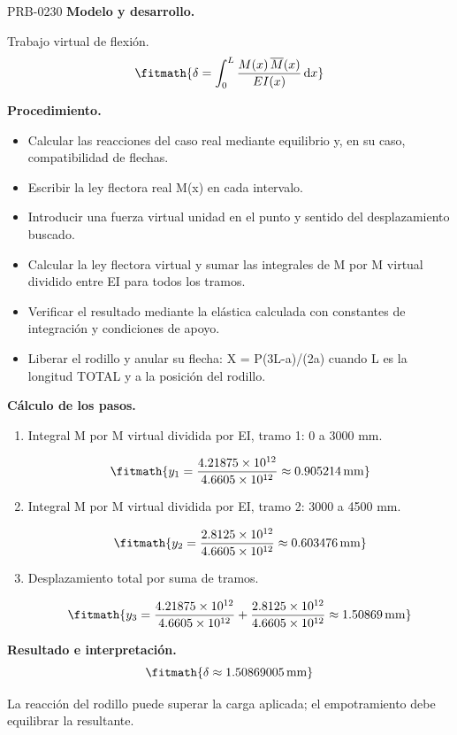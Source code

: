 \begin{studiumworked}{PRB-0230}
\textbf{Modelo y desarrollo.}

Trabajo virtual de flexión.\[\fitmath{\delta = \int_{0}^{L}\frac{M(x)\,\overline{M}(x)}{E I(x)}\,\mathrm{d}x}\]

\textbf{Procedimiento.}\begin{itemize}\item Calcular las reacciones del caso real mediante equilibrio y, en su caso, compatibilidad de flechas.
\item Escribir la ley flectora real M(x) en cada intervalo.
\item Introducir una fuerza virtual unidad en el punto y sentido del desplazamiento buscado.
\item Calcular la ley flectora virtual y sumar las integrales de M por M virtual dividido entre EI para todos los tramos.
\item Verificar el resultado mediante la elástica calculada con constantes de integración y condiciones de apoyo.
\item Liberar el rodillo y anular su flecha: X = P(3L-a)/(2a) cuando L es la longitud TOTAL y a la posición del rodillo.\end{itemize}

\textbf{Cálculo de los pasos.}

\begin{enumerate}

\item Integral M por M virtual dividida por EI, tramo 1: 0 a 3000 mm.

\[\fitmath{y_{1}=\frac{4.21875\times10^{12}}{4.6605\times10^{12}}\approx 0.905214\,\mathrm{mm}}\]

\item Integral M por M virtual dividida por EI, tramo 2: 3000 a 4500 mm.

\[\fitmath{y_{2}=\frac{2.8125\times10^{12}}{4.6605\times10^{12}}\approx 0.603476\,\mathrm{mm}}\]

\item Desplazamiento total por suma de tramos.

\[\fitmath{y_{3}=\frac{4.21875\times10^{12}}{4.6605\times10^{12}}+\frac{2.8125\times10^{12}}{4.6605\times10^{12}}\approx 1.50869\,\mathrm{mm}}\]

\end{enumerate}

\textbf{Resultado e interpretación.}\[\fitmath{\delta \approx 1.50869005\,\mathrm{mm}}\]

La reacción del rodillo puede superar la carga aplicada; el empotramiento debe equilibrar la resultante.


\end{studiumworked}
